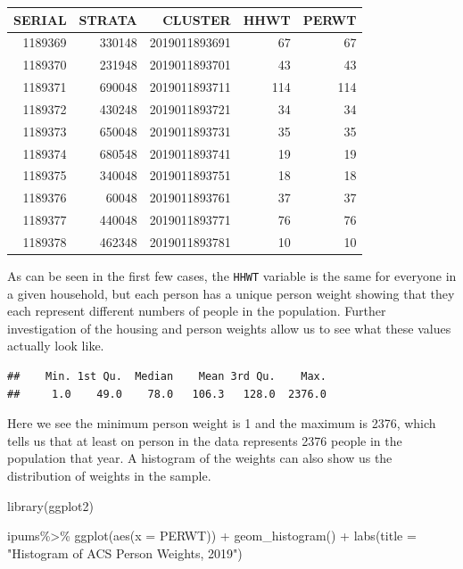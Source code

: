 \documentclass[
]{article}
\newenvironment{Shaded}{\begin{snugshade}}{\end{snugshade}}
\newcommand{\AttributeTok}[1]{\textcolor[rgb]{0.77,0.63,0.00}{#1}}
\newcommand{\FunctionTok}[1]{\textcolor[rgb]{0.00,0.00,0.00}{#1}}
\newcommand{\NormalTok}[1]{#1}
\newcommand{\SpecialCharTok}[1]{\textcolor[rgb]{0.00,0.00,0.00}{#1}}
\newcommand{\StringTok}[1]{\textcolor[rgb]{0.31,0.60,0.02}{#1}}
\begin{document}
\begin{tabular}{r|r|r|r|r}
\hline
SERIAL & STRATA & CLUSTER & HHWT & PERWT\\
\hline
1189369 & 330148 & 2019011893691 & 67 & 67\\
\hline
1189370 & 231948 & 2019011893701 & 43 & 43\\
\hline
1189371 & 690048 & 2019011893711 & 114 & 114\\
\hline
1189372 & 430248 & 2019011893721 & 34 & 34\\
\hline
1189373 & 650048 & 2019011893731 & 35 & 35\\
\hline
1189374 & 680548 & 2019011893741 & 19 & 19\\
\hline
1189375 & 340048 & 2019011893751 & 18 & 18\\
\hline
1189376 & 60048 & 2019011893761 & 37 & 37\\
\hline
1189377 & 440048 & 2019011893771 & 76 & 76\\
\hline
1189378 & 462348 & 2019011893781 & 10 & 10\\
\hline
\end{tabular}

As can be seen in the first few cases, the \texttt{HHWT} variable is the same for everyone in a given household, but each person has a unique person weight showing that they each represent different numbers of people in the population. Further investigation of the housing and person weights allow us to see what these values actually look like.

\begin{Shaded}
\end{Shaded}

\begin{verbatim}
##    Min. 1st Qu.  Median    Mean 3rd Qu.    Max. 
##     1.0    49.0    78.0   106.3   128.0  2376.0
\end{verbatim}

Here we see the minimum person weight is 1 and the maximum is 2376, which tells us that at least on person in the data represents 2376 people in the population that year. A histogram of the weights can also show us the distribution of weights in the sample.

\begin{Shaded}
\begin{Highlighting}[]
\FunctionTok{library}\NormalTok{(ggplot2)}

\NormalTok{ipums}\SpecialCharTok{\%\textgreater{}\%}
  \FunctionTok{ggplot}\NormalTok{(}\FunctionTok{aes}\NormalTok{(}\AttributeTok{x =}\NormalTok{ PERWT)) }\SpecialCharTok{+}
    \FunctionTok{geom\_histogram}\NormalTok{() }\SpecialCharTok{+} 
  \FunctionTok{labs}\NormalTok{(}\AttributeTok{title =} \StringTok{"Histogram of ACS Person Weights, 2019"}\NormalTok{)}
\end{Highlighting}
\end{Shaded}
\end{document}
